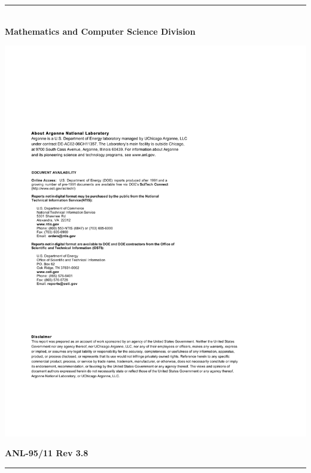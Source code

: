 \vspace*{3in}
\vspace*{8pt}
\hrule
\vspace*{8pt}

\vspace*{1in}
\noindent \\
{\Large {\bf Mathematics and Computer Science Division}}

\vspace*{10pt}


\vspace*{20pt}



\newpage
\centerline{\includegraphics{ArgonneReportTemplatePage2}}
\newpage

\hfill {\large {\bf ANL-95/11 Rev 3.8}}

\vspace*{3in}
\vspace*{8pt}
\hrule
\vspace*{8pt}

